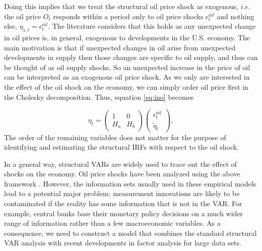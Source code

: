 \documentclass[11pt,a4paper]{article}
\begin{document}


Doing this implies that we treat the structural oil price shock as exogenous, $i.e.$  the oil price $O_t$ responds within a period only to oil price shocks $\epsilon_{t}^{oil}$ and nothing else, $\eta_{1,t} = \epsilon_{t}^{oil}$.
The literature considers that this holds as any unexpected change in oil prices is, in general, exogenous to developments in the U.S. economy. %
The main motivation is that if unexpected changes in oil arise from unexpected developments in supply then those changes are specific to oil supply, and thus can be thought of as oil supply shocks. 
So an unexpected increase in the  price of oil can be interpreted as an exogenous oil price shock. 
As we only are interested in the effect of the oil shock on the economy,  we can simply order oil price first in the Cholesky decomposition. Thus, equation \eqref{eq:ino} becomes 


{\footnotesize \begin{equation}
\eta_t = 
\begin{pmatrix} 1 & 0 \\ H_a & H_b \end{pmatrix}
\begin{pmatrix}  \epsilon_t^{oil} \\ \tilde{\eta}_t \end{pmatrix}, \label{eq:ino2}
\end{equation}}
The order of the remaining variables does not matter for the purpose of identifying and estimating the structural IRFs with respect to the oil shock.
 
In a general way, structural VARs are widely used to trace out the effect of shocks on the economy. Oil price shocks have been analyzed using the above framework \cite[chp. 7]{stock2015factor,gali2010international}.
However, the information sets usually used in these empirical models lead to a potential major problem: 
measurement innovations are likely to be contaminated if the reality has some information that is not in the VAR. 
For example, central banks base their monetary policy decisions on a much wider range of information rather than a few macroeconomic variables. 
As a consequence, we need to construct a model that combines the standard structural VAR analysis with recent developments in factor analysis for large data sets.
\end{document}
